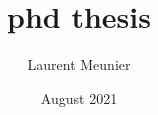 \documentclass{report}
\title{phd thesis}
\author{Laurent Meunier}
\date{August 2021}
\begin{document}
\maketitle
\dominitoc
\tableofcontents
\listoffigures







\newpage

\end{document}
